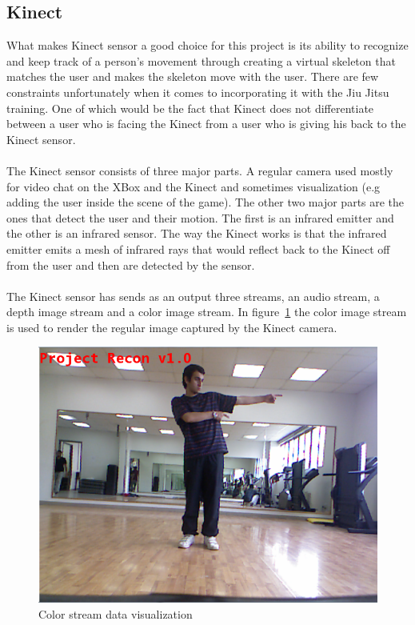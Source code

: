 \subsection{Kinect}
What makes Kinect sensor a good choice for this project is its ability to recognize and keep track of a person's movement through creating a virtual skeleton that matches the user and makes the skeleton move with the user. There are few constraints unfortunately when it comes to incorporating it with the Jiu Jitsu training. One of which would be the fact that Kinect does not differentiate between a user who is facing the Kinect from a user who is giving his back to the Kinect sensor.
\\
\\
The Kinect sensor consists of three major parts. A regular camera used mostly for video chat on the XBox and the Kinect and sometimes visualization (e.g adding the user inside the scene of the game). The other two major parts are the ones that detect the user and their motion. The first is an infrared emitter and the other is an infrared sensor. The way the Kinect works is that the infrared emitter emits a mesh of infrared rays that would reflect back to the Kinect off from the user and then are detected by the sensor.
\\
\\
The Kinect sensor has sends as an output three streams, an audio stream, a depth image stream and a color image stream. In figure~\ref{colordata} the color image stream is used to render the regular image captured by the Kinect camera.

\begin{figure}[!htbp]
\centering
\includegraphics[width=1\textwidth]{images/color_data.png}
\caption{Color stream data visualization}
\label{colordata}
\end{figure}

